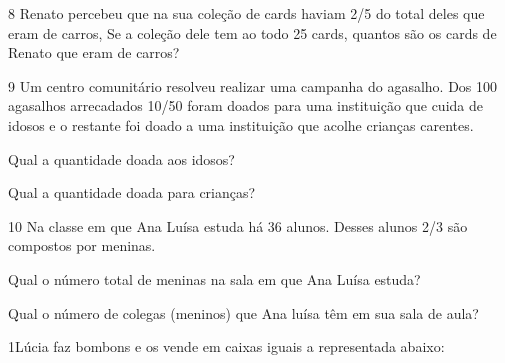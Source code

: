 
\num{8} Renato percebeu que na sua coleção de cards haviam 2/5 do total
deles que eram de carros, Se a coleção dele tem ao todo 25 cards,
quantos são os cards de Renato que eram de carros?



\num{9} Um centro comunitário resolveu realizar uma campanha do agasalho.
Dos 100 agasalhos arrecadados 10/50 foram doados para uma instituição
que cuida de idosos e o restante foi doado a uma instituição que acolhe
crianças carentes.

\begin{escolha}
\item
  Qual a quantidade doada aos idosos?


\item
  Qual a quantidade doada para crianças?

\end{escolha}


\num{10} Na classe em que Ana Luísa estuda há 36 alunos. Desses alunos 2/3
são compostos por meninas.

\begin{escolha}
\item
  Qual o número total de meninas na sala em que Ana Luísa estuda?


\item
  Qual o número de colegas (meninos) que Ana luísa têm em sua sala de
  aula?

\end{escolha}



\num{1}Lúcia faz bombons e os vende em caixas iguais a representada abaixo:


